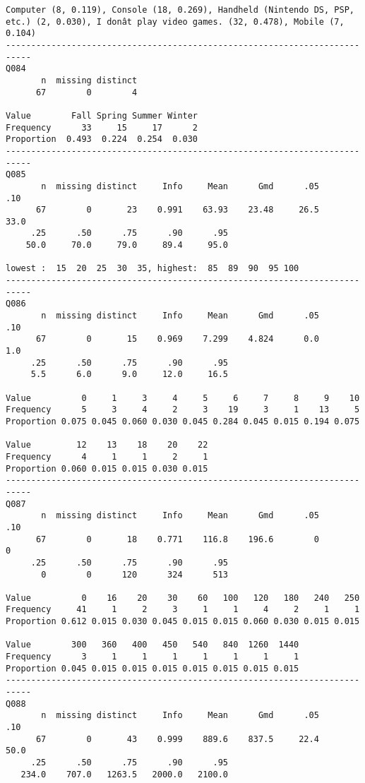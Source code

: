\documentclass[]{article}
\begin{document}
\begin{verbatim}
Computer (8, 0.119), Console (18, 0.269), Handheld (Nintendo DS, PSP,
etc.) (2, 0.030), I donât play video games. (32, 0.478), Mobile (7, 0.104)
---------------------------------------------------------------------------
Q084 
       n  missing distinct 
      67        0        4 
                                      
Value        Fall Spring Summer Winter
Frequency      33     15     17      2
Proportion  0.493  0.224  0.254  0.030
---------------------------------------------------------------------------
Q085 
       n  missing distinct     Info     Mean      Gmd      .05      .10 
      67        0       23    0.991    63.93    23.48     26.5     33.0 
     .25      .50      .75      .90      .95 
    50.0     70.0     79.0     89.4     95.0 

lowest :  15  20  25  30  35, highest:  85  89  90  95 100
---------------------------------------------------------------------------
Q086 
       n  missing distinct     Info     Mean      Gmd      .05      .10 
      67        0       15    0.969    7.299    4.824      0.0      1.0 
     .25      .50      .75      .90      .95 
     5.5      6.0      9.0     12.0     16.5 
                                                                      
Value          0     1     3     4     5     6     7     8     9    10
Frequency      5     3     4     2     3    19     3     1    13     5
Proportion 0.075 0.045 0.060 0.030 0.045 0.284 0.045 0.015 0.194 0.075
                                        
Value         12    13    18    20    22
Frequency      4     1     1     2     1
Proportion 0.060 0.015 0.015 0.030 0.015
---------------------------------------------------------------------------
Q087 
       n  missing distinct     Info     Mean      Gmd      .05      .10 
      67        0       18    0.771    116.8    196.6        0        0 
     .25      .50      .75      .90      .95 
       0        0      120      324      513 
                                                                      
Value          0    16    20    30    60   100   120   180   240   250
Frequency     41     1     2     3     1     1     4     2     1     1
Proportion 0.612 0.015 0.030 0.045 0.015 0.015 0.060 0.030 0.015 0.015
                                                          
Value        300   360   400   450   540   840  1260  1440
Frequency      3     1     1     1     1     1     1     1
Proportion 0.045 0.015 0.015 0.015 0.015 0.015 0.015 0.015
---------------------------------------------------------------------------
Q088 
       n  missing distinct     Info     Mean      Gmd      .05      .10 
      67        0       43    0.999    889.6    837.5     22.4     50.0 
     .25      .50      .75      .90      .95 
   234.0    707.0   1263.5   2000.0   2100.0 


\end{verbatim}
\end{document}
